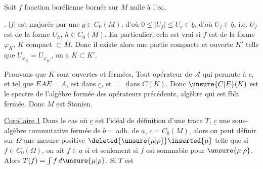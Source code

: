 Soit $f$ fonction borélienne bornée sur $M$ nulle à l'$\infty$,  

. $|f|$ est majorée par une $g\in C_0(M)$, d'où $0\leq|U_f|\leq U_g\in\underline b$, d'où $U_f\in\underline b$, i.e. $U_f$ est de la forme $U_h$, $h\in C_0(M)$. En particulier, cela est vrai si $f$ est de la  forme $\varphi_K$, $K$ compact $\subset M$. Donc il existe alors une partie compacte et ouverte $K'$ telle que $U_{\varphi_K}=U_{\varphi_{K'}}$, on a $K\subset K'$.

Prouvons que $K$ sont ouvertes et fermées,  Tout opérateur  de $\mathcal A$ qui permute à $\underline c$, et tel que $EAE=A$, est dans $\underline c$, et $=$ dans $C(K)$. Donc $\unsure{C|E}(K)$ est le spectre de l'algèbre formée des opérateurs précédents, algèbre qui est  fblt fermée. Donc $M$ est Stonien.

\uline{Corollaire 1} Dans le cas où $\underline c$ est l'idéal de définition d'une trace  $T$, $\underline c$ une sous-algèbre commutative  fermée de $\underline b$ = adh. de $\underline a$, $\underline c=C_0(M)$, alors on peut définir sur $\Omega$ une mesure positive $\deleted{\unsure{\mu|\rho}}\inserted{\mu}$ telle que si $f\in C_0(\Omega)$, on ait $f\in\underline a$ si et seulement si $f$ est sommable pour $\unsure{\mu|\rho}$. Alors $T(f)=\int f\,d\unsure{\mu|\rho}$. Si $T$ est 
